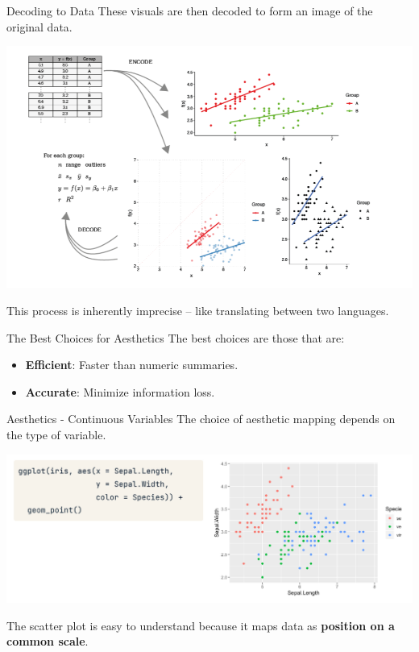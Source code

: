 \documentclass[
  ignorenonframetext,
]{beamer}
\providecommand{\tightlist}{%
  \setlength{\itemsep}{0pt}\setlength{\parskip}{0pt}}
\begin{document}
\begin{frame}{Decoding to Data}
\label{decoding-to-data}
These visuals are then decoded to form an image of the original data.

\includegraphics{../images/im173.png}

This process is inherently imprecise -- like translating between two
languages.
\end{frame}

\begin{frame}{The Best Choices for Aesthetics}
\label{the-best-choices-for-aesthetics}
The best choices are those that are:

\begin{itemize}
\tightlist
\item
  \textbf{Efficient}: Faster than numeric summaries.
\item
  \textbf{Accurate}: Minimize information loss.
\end{itemize}
\end{frame}

\begin{frame}{Aesthetics - Continuous Variables}
\label{aesthetics---continuous-variables}
The choice of aesthetic mapping depends on the type of variable.

\includegraphics{../images/im174.png}

The scatter plot is easy to understand because it maps data as
\textbf{position on a common scale}.
\end{frame}
\end{document}

